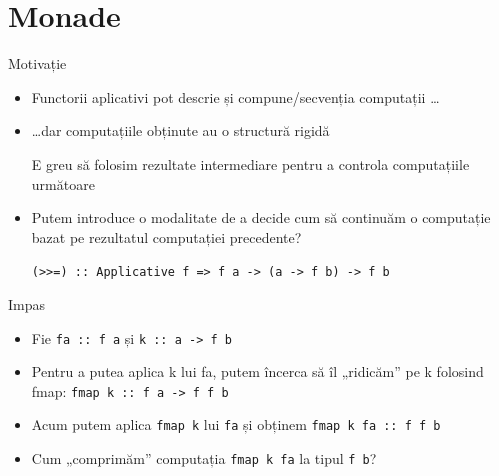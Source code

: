 \documentclass[xcolor=pdftex,romanian,colorlinks]{beamer}
\begin{document}
\section{Monade}
\begin{frame}[fragile]{Motivație}

\begin{itemize}
\item Functorii aplicativi pot descrie și compune/secvenția computații \ldots

\item \ldots dar computațiile obținute au o structură rigidă

E greu să folosim rezultate intermediare pentru a controla computațiile următoare

\item Putem introduce o modalitate de a decide cum să continuăm o computație bazat pe rezultatul computației precedente?

\lstinline$(>>=) :: Applicative f => f a -> (a -> f b) -> f b$
\end{itemize}

\begin{block}{Impas}
\begin{itemize}
\item Fie \lstinline$fa :: f a$  și \lstinline$k :: a -> f b$
\item Pentru a putea aplica k lui fa, putem încerca să îl „ridicăm” pe k folosind fmap: \hfill \lstinline$fmap k :: f a -> f f b$
\item Acum putem aplica \lstinline$fmap k$ lui \lstinline$fa$ și obținem
\hfill \lstinline$fmap k fa :: f f b$

\item Cum „comprimăm” computația \lstinline$fmap k fa$ la tipul \lstinline$f b$?
\end{itemize}
\end{block}
\end{frame}
\end{document}

